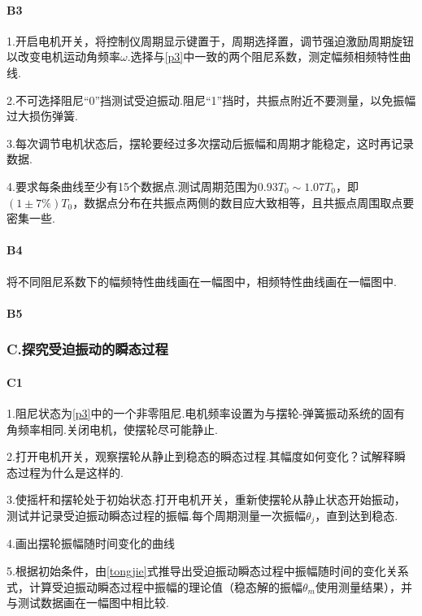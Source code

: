 \documentclass[12pt,a4paper,oneside,left=3.18,right=3.18,top=2.54,bottom=2.54]{ctexart}
\begin{document}
			\paragraph{B3}
				\par
				\romannumeral1.开启电机开关，将控制仪周期显示键置于，周期选择置，调节强迫激励周期旋钮以改变电机运动角频率$\omega$.选择与\ref{p3}中一致的两个阻尼系数，测定幅频相频特性曲线.\par
				\romannumeral2.不可选择阻尼“0”挡测试受迫振动.阻尼“1”挡时，共振点附近不要测量，以免振幅过大损伤弹簧.\par
				\romannumeral3.每次调节电机状态后，摆轮要经过多次摆动后振幅和周期才能稳定，这时再记录数据.\par
				\romannumeral4.要求每条曲线至少有15个数据点.测试周期范围为$0.93T_0\sim 1.07T_0$，即$(1\pm7\%)T_0$，数据点分布在共振点两侧的数目应大致相等，且共振点周围取点要密集一些.
			\paragraph{B4}
				\par
				将不同阻尼系数下的幅频特性曲线画在一幅图中，相频特性曲线画在一幅图中.
			\paragraph{B5}
				\par
		\subsubsection{C.探究受迫振动的瞬态过程}
			\paragraph{C1}
				\par
				\romannumeral1.阻尼状态为\ref{p3}中的一个非零阻尼.电机频率设置为与摆轮-弹簧振动系统的固有角频率相同.关闭电机，使摆轮尽可能静止.\par
				\romannumeral2.打开电机开关，观察摆轮从静止到稳态的瞬态过程.其幅度如何变化？试解释瞬态过程为什么是这样的.\par
				\romannumeral3.使摇杆和摆轮处于初始状态.打开电机开关，重新使摆轮从静止状态开始振动，测试并记录受迫振动瞬态过程的振幅.每个周期测量一次振幅$\theta_j$，直到达到稳态.\par
				\romannumeral4.画出摆轮振幅随时间变化的曲线\par
				\romannumeral5.根据初始条件，由\eqref{tongjie}式推导出受迫振动瞬态过程中振幅随时间的变化关系式，计算受迫振动瞬态过程中振幅的理论值（稳态解的振幅$\theta_m$使用测量结果），并与测试数据画在一幅图中相比较.
\end{document}
